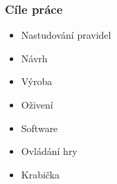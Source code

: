 \documentclass[%
  12pt,       				%
	t,                  %
	aspectratio=1610,   %
	unicode,						%
]{beamer}				    	%
\begin{document}
\disablenavigationsymbols

\maketitle

\begin{frame} 
	\frametitle{Cíle práce}
	\vspace{1cm}
	\begin{itemize}
			\item Nastudování pravidel
			\item Návrh
			\item Výroba
			\item Oživení
			\item Software
			\item Ovládání hry
			\item Krabička
	\end{itemize}
\end{frame}
\end{document}
